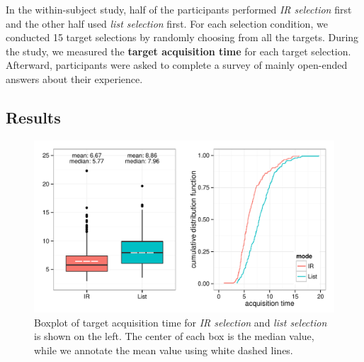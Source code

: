 In the within-subject study, half of the participants performed {\em IR selection} first and the other half used {\em list selection} first. For each selection condition, we conducted 15 target selections by randomly choosing from all the targets. During the study, we measured the {\bf target acquisition time} for each target selection. Afterward, participants were asked to complete a survey of mainly open-ended answers about their experience.


\subsection{Results}

\begin{figure}[t]
\centering
\includegraphics[width=1.0\columnwidth]{figures/result_study1a.pdf}
\caption{Boxplot of target acquisition time for {\em IR selection} and {\em list selection} is shown on the left. The center of each box is the median value, while we annotate the mean value using white dashed lines.}
\label{fig:ir_vs_list}
\end{figure}

